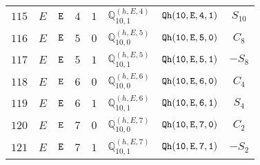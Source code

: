 \documentclass[fleqn,8pt]{jsarticle}
\begin{document}
\begin{table}[ht!]
\begin{center}
\begin{tabular}{cccccccc}
$ 115 $ & $ E $ & $ {\tt E} $ & $ 4 $ & $ 1 $ & $ \mathbb{Q}_{10,1}^{(h,E,4)} $ & $ {\tt Qh(10,E,4,1)} $ & $ S_{10} $ \\
$ 116 $ & $ E $ & $ {\tt E} $ & $ 5 $ & $ 0 $ & $ \mathbb{Q}_{10,0}^{(h,E,5)} $ & $ {\tt Qh(10,E,5,0)} $ & $ C_{8} $ \\
$ 117 $ & $ E $ & $ {\tt E} $ & $ 5 $ & $ 1 $ & $ \mathbb{Q}_{10,1}^{(h,E,5)} $ & $ {\tt Qh(10,E,5,1)} $ & $ - S_{8} $ \\
$ 118 $ & $ E $ & $ {\tt E} $ & $ 6 $ & $ 0 $ & $ \mathbb{Q}_{10,0}^{(h,E,6)} $ & $ {\tt Qh(10,E,6,0)} $ & $ C_{4} $ \\
$ 119 $ & $ E $ & $ {\tt E} $ & $ 6 $ & $ 1 $ & $ \mathbb{Q}_{10,1}^{(h,E,6)} $ & $ {\tt Qh(10,E,6,1)} $ & $ S_{4} $ \\
$ 120 $ & $ E $ & $ {\tt E} $ & $ 7 $ & $ 0 $ & $ \mathbb{Q}_{10,0}^{(h,E,7)} $ & $ {\tt Qh(10,E,7,0)} $ & $ C_{2} $ \\
$ 121 $ & $ E $ & $ {\tt E} $ & $ 7 $ & $ 1 $ & $ \mathbb{Q}_{10,1}^{(h,E,7)} $ & $ {\tt Qh(10,E,7,1)} $ & $ - S_{2} $ \\
 \hline \hline
\end{tabular}
\end{center}
\end{table}
\end{document}
